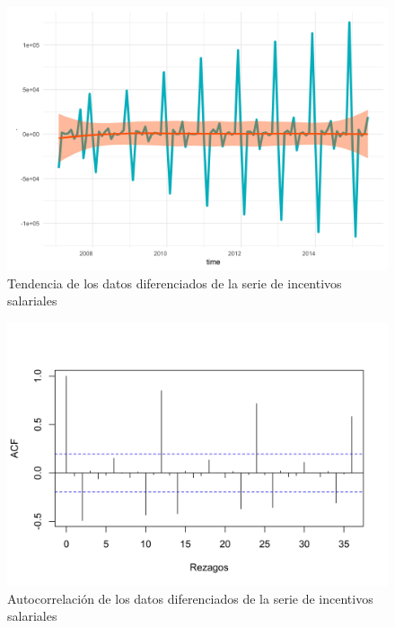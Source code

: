 \documentclass[
]{article}
\begin{document}
\begin{figure}[H]
\includegraphics[width=1\linewidth,height=1\textheight]{Tesis_files/figure-latex/incentivos_comportamiento-1} \caption{Tendencia de los datos diferenciados de la serie de incentivos salariales}\label{fig:incentivos_comportamiento}
\end{figure}

\begin{figure}[H]
\includegraphics[width=1\linewidth,height=1\textheight]{Tesis_files/figure-latex/incentivos_acf-1} \caption{Autocorrelación de los datos diferenciados de la serie de incentivos salariales}\label{fig:incentivos_acf}
\end{figure}
\end{document}

